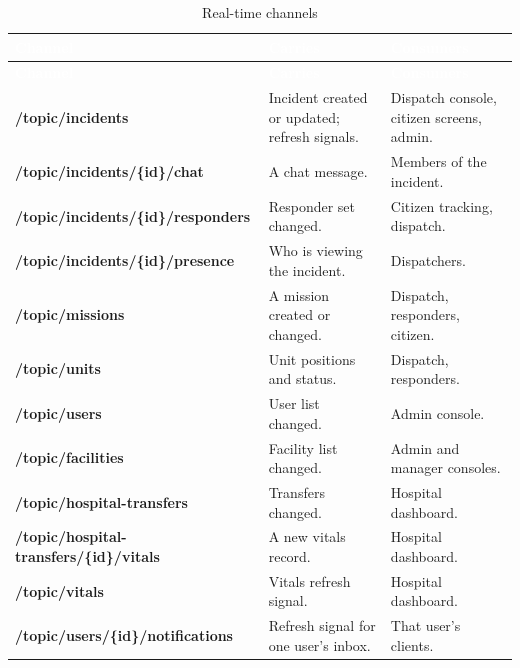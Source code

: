 {\tabfont\rowband
\begin{longtable}{@{}>{\raggedright\arraybackslash}p{}>{\raggedright\arraybackslash}p{}>{\raggedright\arraybackslash}p{}@{}}
\caption{Real-time channels}\label{tab:realtime}\\
\rowcolor{najdanavy}\textcolor{white}{\sffamily\bfseries\small Channel} & \textcolor{white}{\sffamily\bfseries\small Carries} & \textcolor{white}{\sffamily\bfseries\small Consumers}\\
\endfirsthead
\rowcolor{najdanavy}\textcolor{white}{\sffamily\bfseries\small Channel} & \textcolor{white}{\sffamily\bfseries\small Carries} & \textcolor{white}{\sffamily\bfseries\small Consumers}\\
\endhead
\bottomrule\endlastfoot
\textbf{/\allowbreak{}topic/\allowbreak{}incidents} & Incident created or updated; refresh signals. & Dispatch console, citizen screens, admin.\\
\textbf{/\allowbreak{}topic/\allowbreak{}incidents/\allowbreak{}\{id\}/\allowbreak{}chat} & A chat message. & Members of the incident.\\
\textbf{/\allowbreak{}topic/\allowbreak{}incidents/\allowbreak{}\{id\}/\allowbreak{}responders} & Responder set changed. & Citizen tracking, dispatch.\\
\textbf{/\allowbreak{}topic/\allowbreak{}incidents/\allowbreak{}\{id\}/\allowbreak{}presence} & Who is viewing the incident. & Dispatchers.\\
\textbf{/\allowbreak{}topic/\allowbreak{}missions} & A mission created or changed. & Dispatch, responders, citizen.\\
\textbf{/\allowbreak{}topic/\allowbreak{}units} & Unit positions and status. & Dispatch, responders.\\
\textbf{/\allowbreak{}topic/\allowbreak{}users} & User list changed. & Admin console.\\
\textbf{/\allowbreak{}topic/\allowbreak{}facilities} & Facility list changed. & Admin and manager consoles.\\
\textbf{/\allowbreak{}topic/\allowbreak{}hospital-transfers} & Transfers changed. & Hospital dashboard.\\
\textbf{/\allowbreak{}topic/\allowbreak{}hospital-transfers/\allowbreak{}\{id\}/\allowbreak{}vitals} & A new vitals record. & Hospital dashboard.\\
\textbf{/\allowbreak{}topic/\allowbreak{}vitals} & Vitals refresh signal. & Hospital dashboard.\\
\textbf{/\allowbreak{}topic/\allowbreak{}users/\allowbreak{}\{id\}/\allowbreak{}notifications} & Refresh signal for one user’s inbox. & That user’s clients.\\
\end{longtable}}
